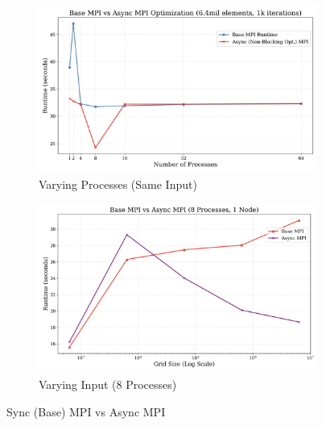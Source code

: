 \documentclass[a4paper,10pt]{article}
\begin{document}
\begin{figure}[H]
     \centering
     \begin{subfigure}[b]{0.45\textwidth}
         \centering
         \includegraphics[width=\textwidth]{../images/4_opt/opt1.png}
         \caption{Varying Processes (Same Input)}
         \label{fig:4_opt1}
     \end{subfigure}
     \hfill
     \begin{subfigure}[b]{0.45\textwidth}
         \centering
         \includegraphics[width=\textwidth]{../images/4_opt/opt_compare_8.png}
         \caption{Varying Input (8 Processes)}
         \label{fig:4_opt_compare_8}
     \end{subfigure}
     \caption{Sync (Base) MPI vs Async MPI}
     \label{fig:4_opt_async_runtimes}
\end{figure}
\end{document}
